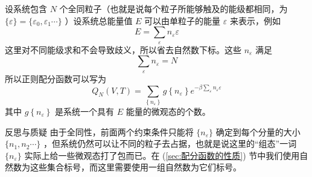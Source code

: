 设系统包含 $N$ 个全同粒子（也就是说每个粒子所能够触及的能级都相同，为 $\{\varepsilon\} = \{\varepsilon_0,\varepsilon_1\cdots\}$ ）设系统总能量值 $E$ 可以由单粒子的能量 $\varepsilon$ 来表示，例如
\[
    E = \sum_\varepsilon n_\varepsilon \varepsilon
\]
这里对不同能级求和不会导致歧义，所以省去自然数下标。这些 $n_\varepsilon$ 满足
\[
    \sum_\varepsilon n_\varepsilon = N
\]
所以正则配分函数可以写为
\begin{equation}\label{equ:canonical_quantum}
    Q_N(V, T)=\sum_{\left\{n_{\varepsilon}\right\}} g\left\{n_{\varepsilon}\right\} e^{-\beta \sum_{\varepsilon} n_{\varepsilon} \varepsilon}
\end{equation}
其中 $g\left\{n_{\varepsilon}\right\}$ 是系统一个具有 $E$ 能量的微观态的个数。

\begin{justification}{\kaishu 反思与质疑}
    \kaishu \fontsize{11pt}{16pt}
        由于全同性，前面两个约束条件只能将 $\{n_{\varepsilon}\}$ 确定到每个分量的大小 $\{n_1,n_2\cdots\}$ ，但系统仍然可以让不同的粒子去占据，也就是说这里的“组态”一词 $\{n_{\varepsilon}\}$ 实际上给一些微观态打了包而已。在 (\ref*{sec:配分函数的性质}) 节中我们使用自然数为这些集合标号，而这里需要使用一组自然数为它们标号。
\end{justification}

